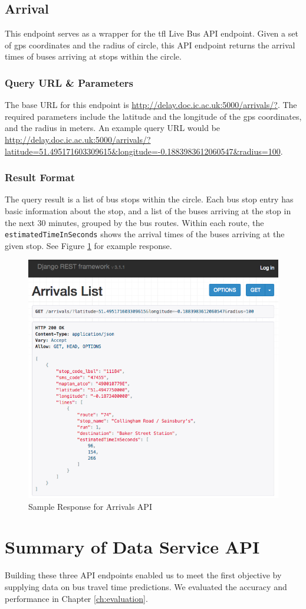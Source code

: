 \subsection{Arrival}
\par This endpoint serves as a wrapper for the \acrshort{tfl} Live Bus API endpoint. Given a set of \acrshort{gps} coordinates and the radius of circle, this API endpoint returns the arrival times of buses arriving at stops within the circle.

\subsubsection{Query URL \& Parameters}
\par The base URL for this endpoint is \url{http://delay.doc.ic.ac.uk:5000/arrivals/?}. The required parameters include the latitude and the longitude of the \acrshort{gps} coordinates, and the radius in meters. An example query URL would be \url{http://delay.doc.ic.ac.uk:5000/arrivals/?latitude=51.495171603309615&longitude=-0.1883983612060547&radius=100}.

\subsubsection{Result Format}
\par The query result is a list of bus stops within the circle. Each bus stop entry has basic information about the stop, and a list of the buses arriving at the stop in the next 30 minutes, grouped by the bus routes. Within each route, the \texttt{estimatedTimeInSeconds} shows the arrival times of the buses arriving at the given stop. See Figure \ref{fig:arrival_api} for example response.


\begin{figure}
\centering
\includegraphics[width=\textwidth]{figures/arrival_api.png}
\caption{\label{fig:arrival_api} Sample Response for Arrivals API}
\end{figure}

\section{Summary of Data Service API}
Building these three API endpoints enabled us to meet the first objective by supplying data on bus travel time predictions. We evaluated the accuracy and performance in Chapter \ref{ch:evaluation}.
